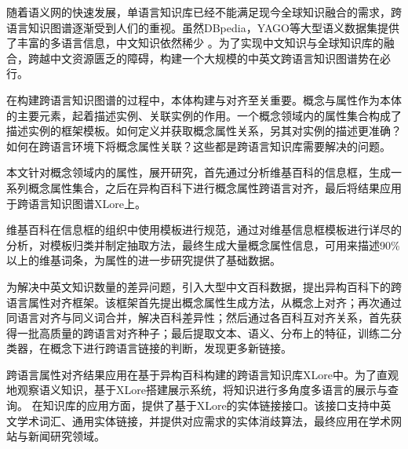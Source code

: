 \begin{cabstract}
随着语义网的快速发展，单语言知识库已经不能满足现今全球知识融合的需求，跨语言知识图谱逐渐受到人们的重视。虽然DBpedia，YAGO等大型语义数据集提供了丰富的多语言信息，中文知识依然稀少
。为了实现中文知识与全球知识库的融合，跨越中文资源匮乏的障碍，构建一个大规模的中英文跨语言知识图谱势在必行。

在构建跨语言知识图谱的过程中，本体构建与对齐至关重要。概念与属性作为本体的主要元素，起着描述实例、关联实例的作用。一个概念领域内的属性集合构成了描述实例的框架模板。如何定义并获取概念属性关系，另其对实例的描述更准确？如何在跨语言环境下将概念属性关联？这些都是跨语言知识库需要解决的问题。

本文针对概念领域内的属性，展开研究，首先通过分析维基百科的信息框，生成一系列概念属性集合，之后在异构百科下进行概念属性跨语言对齐，最后将结果应用于跨语言知识图谱XLore上。

维基百科在信息框的组织中使用模板进行规范，通过对维基信息框模板进行详尽的分析，对模板归类并制定抽取方法，最终生成大量概念属性信息，可用来描述90\%以上的维基词条，为属性的进一步研究提供了基础数据。

为解决中英文知识数量的差异问题，引入大型中文百科数据，提出异构百科下的跨语言属性对齐框架。该框架首先提出概念属性生成方法，从概念上对齐；再次通过同语言对齐与同义词合并，解决百科差异性；然后通过各百科互对齐关系，首先获得一批高质量的跨语言对齐种子；最后提取文本、语义、分布上的特征，训练二分类器，在概念下进行跨语言链接的判断，发现更多新链接。

跨语言属性对齐结果应用在基于异构百科构建的跨语言知识库XLore中。为了直观地观察语义知识，基于XLore搭建展示系统，将知识进行多角度多语言的展示与查询。 
在知识库的应用方面，提供了基于XLore的实体链接接口。该接口支持中英文学术词汇、通用实体链接，并提供对应需求的实体消歧算法，最终应用在学术网站与新闻研究领域。

\end{cabstract}



